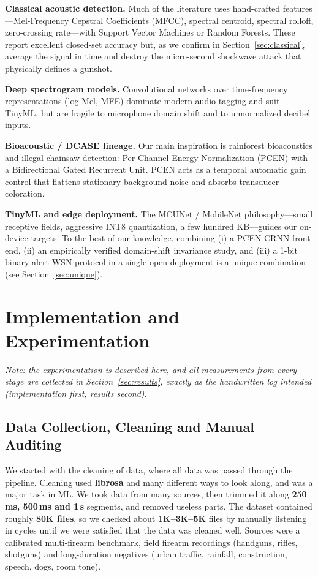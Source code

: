 \documentclass[conference]{IEEEtran}
\begin{document}
\textbf{Classical acoustic detection.} Much of the literature uses hand-crafted features---Mel-Frequency
Cepstral Coefficients (MFCC), spectral centroid, spectral rolloff, zero-crossing rate---with Support Vector
Machines or Random Forests. These report excellent closed-set accuracy but, as we confirm in
Section~\ref{sec:classical}, average the signal in time and destroy the micro-second shockwave attack that
physically defines a gunshot.

\textbf{Deep spectrogram models.} Convolutional networks over time-frequency representations (log-Mel, MFE)
dominate modern audio tagging and suit TinyML, but are fragile to microphone domain shift and to unnormalized
decibel inputs.

\textbf{Bioacoustic / DCASE lineage.} Our main inspiration is rainforest bioacoustics and illegal-chainsaw
detection: Per-Channel Energy Normalization (PCEN) with a Bidirectional Gated Recurrent Unit. PCEN acts as a
temporal automatic gain control that flattens stationary background noise and absorbs transducer coloration.

\textbf{TinyML and edge deployment.} The MCUNet / MobileNet philosophy---small receptive fields, aggressive
INT8 quantization, a few hundred KB---guides our on-device targets. To the best of our knowledge, combining
(i) a PCEN-CRNN front-end, (ii) an empirically verified domain-shift invariance study, and (iii) a 1-bit
binary-alert WSN protocol in a single open deployment is a unique combination (see Section~\ref{sec:unique}).

\section{Implementation and Experimentation}
\label{sec:method}
\textit{Note: the experimentation is described here, and all measurements from every stage are collected in
Section~\ref{sec:results}, exactly as the handwritten log intended (implementation first, results second).}

\subsection{Data Collection, Cleaning and Manual Auditing}
We started with the cleaning of data, where all data was passed through the pipeline. Cleaning used
\textbf{librosa} and many different ways to look along, and was a major task in ML. We took data from many
sources, then trimmed it along \textbf{250\,ms, 500\,ms and 1\,s} segments, and removed useless parts. The
dataset contained roughly \textbf{80K files}, so we checked about \textbf{1K--3K--5K} files by manually
listening in cycles until we were satisfied that the data was cleaned well. Sources were a calibrated
multi-firearm benchmark, field firearm recordings (handguns, rifles, shotguns) and long-duration negatives
(urban traffic, rainfall, construction, speech, dogs, room tone).
\end{document}
